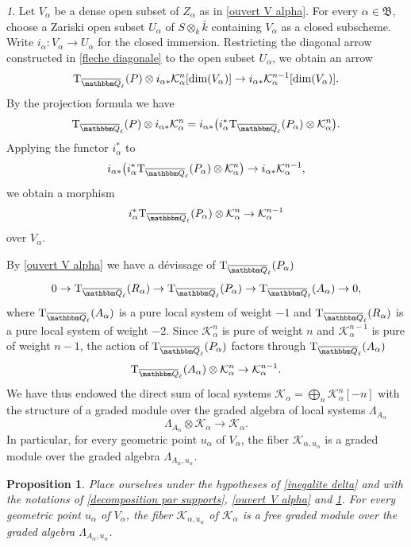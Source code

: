 \documentclass[12pt,english]{smfart}
\numberwithin{equation}{subsection}
\newtheorem{proposition}[equation]{Proposition}
\theoremstyle{remark}
\newtheorem{numero}[equation]{}
\newcommand\calK{{\mathcal K}}
\newcommand\rmT{{\rm T}}
\newcommand\FrakB{{\mathfrak B}}
\newcommand\QQ{{\mathbbm Q}}
\newcommand\Ql{{\overline\QQ_\ell}}
\begin{document}
\begin{numero}\label{structure de module gradue}
Let $V_\alpha$ be a dense open subset of $Z_\alpha$ as in \ref{ouvert V alpha}. For every $\alpha\in\FrakB$, choose a Zariski open subset $U_\alpha$ of $S\otimes_k\bar k$ containing $V_\alpha$ as a closed subscheme. Write $i_\alpha:V_\alpha\rightarrow U_\alpha$ for the closed immersion. Restricting the diagonal arrow constructed in \ref{fleche diagonale} to the open subset $U_\alpha$, we obtain an arrow
$$\rmT_\Ql(P)\otimes i_{\alpha*}\calK^n_\alpha[\dim(V_\alpha)] \rightarrow i_{\alpha*}\calK^{n-1}_\alpha[\dim(V_\alpha)].$$
By the projection formula we have
$$\rmT_\Ql(P)\otimes i_{\alpha*}\calK^n_\alpha = i_{\alpha*}\big(i_\alpha^*\rmT_\Ql(P_\alpha)\otimes \calK^n_\alpha\big).$$
Applying the functor $i_\alpha^*$ to
$$i_{\alpha*}\big(i_\alpha^*\rmT_\Ql(P_\alpha)\otimes \calK^n_\alpha\big) \rightarrow i_{\alpha*}\calK^{n-1}_\alpha,$$
we obtain a morphism
$$i_\alpha^*\rmT_\Ql(P_\alpha)\otimes \calK^n_\alpha \rightarrow \calK^{n-1}_\alpha$$
over $V_\alpha$.

By \ref{ouvert V alpha} we have a d\'evissage of $\rmT_\Ql(P_\alpha)$
$$0\rightarrow \rmT_\Ql(R_\alpha)\rightarrow \rmT_\Ql(P_\alpha)\rightarrow \rmT_\Ql(A_\alpha)\rightarrow 0,$$
where $\rmT_\Ql(A_\alpha)$ is a pure local system of weight $-1$ and $\rmT_\Ql(R_\alpha)$ is a pure local system of weight $-2$. Since $\calK^n_\alpha$ is pure of weight $n$ and $\calK^{n-1}_\alpha$ is pure of weight $n-1$, the action of $\rmT_\Ql(P_\alpha)$ factors through $\rmT_\Ql(A_\alpha)$
$$\rmT_\Ql(A_\alpha)\otimes \calK^n_\alpha \rightarrow \calK^{n-1}_\alpha.$$
We have thus endowed the direct sum of local systems $\calK_\alpha=\bigoplus_n \calK^n_\alpha[-n]$ with the structure of a graded module over the graded algebra of local systems $\Lambda_{A_\alpha}$
$$\Lambda_{A_\alpha}\otimes \calK_\alpha \rightarrow \calK_\alpha.$$
In particular, for every geometric point $u_\alpha$ of $V_\alpha$, the fiber $\calK_{\alpha,u_\alpha}$ is a graded module over the graded algebra $\Lambda_{A_\alpha,u_\alpha}$.
\end{numero}

\begin{proposition}\label{liberte}
Place ourselves under the hypotheses of \ref{inegalite delta} and with the notations of \ref{decomposition par supports}, \ref{ouvert V alpha} and \ref{structure de module gradue}. For every geometric point $u_\alpha$ of $V_\alpha$, the fiber $\calK_{\alpha,u_\alpha}$ of $\calK_\alpha$ is a free graded module over the graded algebra $\Lambda_{A_\alpha,u_\alpha}$.
\end{proposition}
\end{document}

